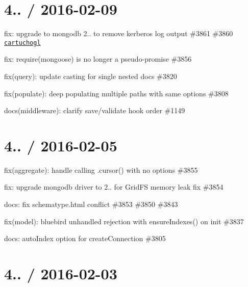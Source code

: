 \section*{4.. / 2016-\/02-\/09 }


\begin{DoxyItemize}
\item fix\+: upgrade to mongodb 2.. to remove kerberos log output \#3861 \#3860 \href{https://github.com/cartuchogl}{\tt cartuchogl}
\item fix\+: require(\textquotesingle{}mongoose\textquotesingle{}) is no longer a pseudo-\/promise \#3856
\item fix(query)\+: update casting for single nested docs \#3820
\item fix(populate)\+: deep populating multiple paths with same options \#3808
\item docs(middleware)\+: clarify save/validate hook order \#1149
\end{DoxyItemize}

\section*{4.. / 2016-\/02-\/05 }


\begin{DoxyItemize}
\item fix(aggregate)\+: handle calling .cursor() with no options \#3855
\item fix\+: upgrade mongodb driver to 2.. for Grid\+FS memory leak fix \#3854
\item docs\+: fix schematype.\+html conflict \#3853 \#3850 \#3843
\item fix(model)\+: bluebird unhandled rejection with ensure\+Indexes() on init \#3837
\item docs\+: auto\+Index option for create\+Connection \#3805
\end{DoxyItemize}

\section*{4.. / 2016-\/02-\/03 }


